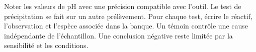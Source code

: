 \par\noindent\begin{minipage}{\linewidth}
\label{cor-activite-4}
Noter les valeurs de pH avec une précision compatible avec l’outil. Le test de précipitation se fait sur un autre prélèvement. Pour chaque test, écrire le réactif, l’observation et l’espèce associée dans la banque. Un témoin contrôle une cause indépendante de l’échantillon. Une conclusion négative reste limitée par la sensibilité et les conditions.\par\end{minipage}
